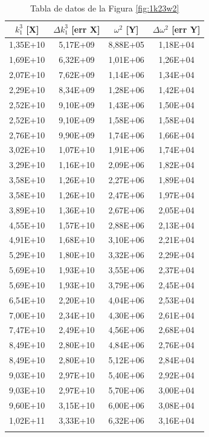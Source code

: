 \documentclass[a4paper,12pt,spanish]{article}
\begin{document}
	
	\begin{longtable}[c]{|c|c|c|c|}
		\hline
		$k_1^3$ [X] & $\Delta k_1^3$ [err X] & $\omega^2$ [Y] & $\Delta \omega^2$ [err Y] \\ \hline
		\endfirsthead
		\endhead
		1,35E+10 & 5,17E+09 & 8,88E+05 & 1,18E+04 \\ \hline
		1,69E+10 & 6,32E+09 & 1,01E+06 & 1,26E+04 \\ \hline
		2,07E+10 & 7,62E+09 & 1,14E+06 & 1,34E+04 \\ \hline
		2,29E+10 & 8,34E+09 & 1,28E+06 & 1,42E+04 \\ \hline
		2,52E+10 & 9,10E+09 & 1,43E+06 & 1,50E+04 \\ \hline
		2,52E+10 & 9,10E+09 & 1,58E+06 & 1,58E+04 \\ \hline
		2,76E+10 & 9,90E+09 & 1,74E+06 & 1,66E+04 \\ \hline
		3,02E+10 & 1,07E+10 & 1,91E+06 & 1,74E+04 \\ \hline
		3,29E+10 & 1,16E+10 & 2,09E+06 & 1,82E+04 \\ \hline
		3,58E+10 & 1,26E+10 & 2,27E+06 & 1,89E+04 \\ \hline
		3,58E+10 & 1,26E+10 & 2,47E+06 & 1,97E+04 \\ \hline
		3,89E+10 & 1,36E+10 & 2,67E+06 & 2,05E+04 \\ \hline
		4,55E+10 & 1,57E+10 & 2,88E+06 & 2,13E+04 \\ \hline
		4,91E+10 & 1,68E+10 & 3,10E+06 & 2,21E+04 \\ \hline
		5,29E+10 & 1,80E+10 & 3,32E+06 & 2,29E+04 \\ \hline
		5,69E+10 & 1,93E+10 & 3,55E+06 & 2,37E+04 \\ \hline
		5,69E+10 & 1,93E+10 & 3,79E+06 & 2,45E+04 \\ \hline
		6,54E+10 & 2,20E+10 & 4,04E+06 & 2,53E+04 \\ \hline
		7,00E+10 & 2,34E+10 & 4,30E+06 & 2,61E+04 \\ \hline
		7,47E+10 & 2,49E+10 & 4,56E+06 & 2,68E+04 \\ \hline
		8,49E+10 & 2,80E+10 & 4,84E+06 & 2,76E+04 \\ \hline
		8,49E+10 & 2,80E+10 & 5,12E+06 & 2,84E+04 \\ \hline
		9,03E+10 & 2,97E+10 & 5,40E+06 & 2,92E+04 \\ \hline
		9,03E+10 & 2,97E+10 & 5,70E+06 & 3,00E+04 \\ \hline
		9,60E+10 & 3,15E+10 & 6,00E+06 & 3,08E+04 \\ \hline
		1,02E+11 & 3,33E+10 & 6,32E+06 & 3,16E+04 \\ \hline
		\caption{Tabla de datos de la Figura \ref{fig:1k23w2}}
	\end{longtable}
	
\end{document}
